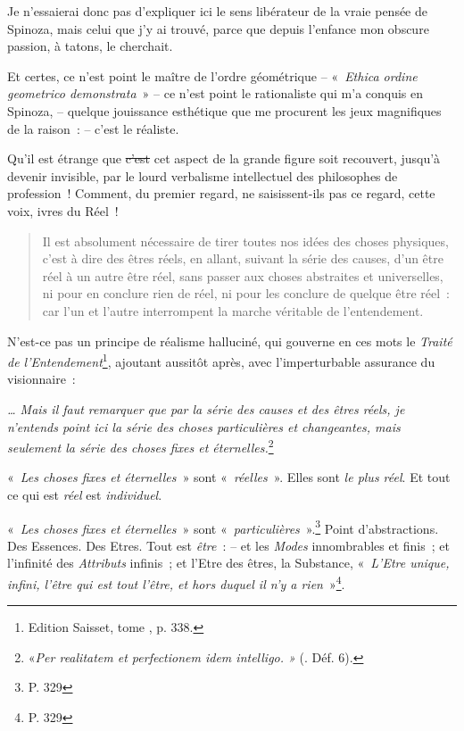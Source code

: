 Je n'essaierai donc pas d'expliquer ici le sens libérateur de la vraie
pensée de Spinoza, mais celui que j'y ai trouvé, parce que depuis
l'enfance mon obscure passion, à tatons, le cherchait.

Et certes, ce n'est point le maître de l'ordre géométrique --
«~\emph{Ethica ordine geometrico demonstrata}~» -- ce n'est point le
rationaliste qui m'a conquis en Spinoza, -- quelque jouissance
esthétique que me procurent les jeux magnifiques de la raison~: -- c'est
le réaliste.

Qu'il est étrange que \sout{c'est} cet aspect de la grande figure soit
recouvert, jusqu'à devenir invisible, par le lourd verbalisme
intellectuel des philosophes de profession~! Comment, du premier regard,
ne saisissent-ils pas ce regard, cette voix, ivres du Réel~!

\begin{quote}
Il est absolument nécessaire de tirer toutes nos idées des choses
physiques, c'est à dire des êtres réels, en allant, suivant la série des
causes, d'un être réel à un autre être réel, sans passer aux choses
abstraites et universelles, ni pour en conclure rien de réel, ni pour
les conclure de quelque être réel~: car l'un et l'autre interrompent la
marche véritable de l'entendement.
\end{quote}

N'est-ce pas un principe de réalisme halluciné, qui gouverne en ces mots
le \emph{Traité de l'Entendement}\footnote{Edition Saisset, tome , p.
  338.}, ajoutant aussitôt après, avec l'imperturbable assurance du
visionnaire~:

\emph{\ldots{} Mais il faut remarquer que par la série des causes et des
êtres réels, je n'entends point ici la série des choses particulières et
changeantes, mais seulement la série des choses fixes et
éternelles.}\footnote{«\emph{Per realitatem et perfectionem idem
  intelligo. »} (. Déf. 6).}

«~\emph{Les choses fixes et éternelles~}» sont «~\emph{réelles}~». Elles
sont \emph{le plus réel}. Et tout ce qui est \emph{réel} est
\emph{individuel}.

«~\emph{Les choses fixes et éternelles}~» sont
«~\emph{particulières}~».\footnote{P. 329} Point d'abstractions. Des
Essences. Des Etres. Tout est \emph{être~}: -- et les \emph{Modes}
innombrables et finis~; et l'infinité des \emph{Attributs} infinis~; et
l'Etre des êtres, la Substance, «~\emph{L'Etre unique, infini, l'être
qui est tout l'être, et hors duquel il n'y a rien}~»\footnote{P. 329}.

